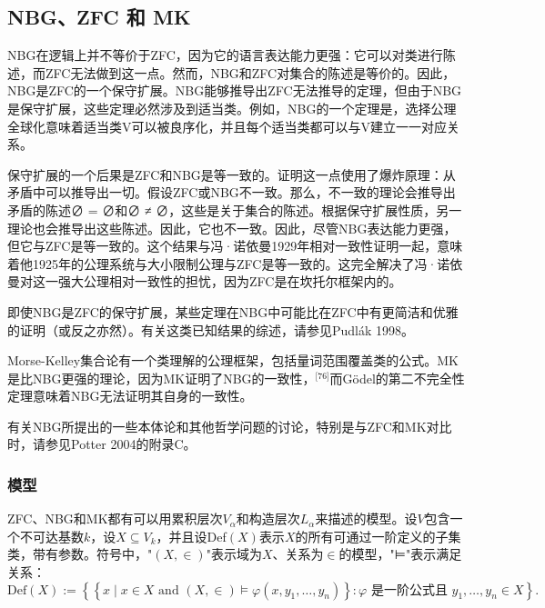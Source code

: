 \subsection{NBG、ZFC 和 MK}  
NBG在逻辑上并不等价于ZFC，因为它的语言表达能力更强：它可以对类进行陈述，而ZFC无法做到这一点。然而，NBG和ZFC对集合的陈述是等价的。因此，NBG是ZFC的一个保守扩展。NBG能够推导出ZFC无法推导的定理，但由于NBG是保守扩展，这些定理必然涉及到适当类。例如，NBG的一个定理是，选择公理全球化意味着适当类V可以被良序化，并且每个适当类都可以与V建立一一对应关系。

保守扩展的一个后果是ZFC和NBG是等一致的。证明这一点使用了爆炸原理：从矛盾中可以推导出一切。假设ZFC或NBG不一致。那么，不一致的理论会推导出矛盾的陈述∅ = ∅和∅ ≠ ∅，这些是关于集合的陈述。根据保守扩展性质，另一理论也会推导出这些陈述。因此，它也不一致。因此，尽管NBG表达能力更强，但它与ZFC是等一致的。这个结果与冯·诺依曼1929年相对一致性证明一起，意味着他1925年的公理系统与大小限制公理与ZFC是等一致的。这完全解决了冯·诺依曼对这一强大公理相对一致性的担忧，因为ZFC是在坎托尔框架内的。

即使NBG是ZFC的保守扩展，某些定理在NBG中可能比在ZFC中有更简洁和优雅的证明（或反之亦然）。有关这类已知结果的综述，请参见Pudlák 1998。

Morse-Kelley集合论有一个类理解的公理框架，包括量词范围覆盖类的公式。MK是比NBG更强的理论，因为MK证明了NBG的一致性，\(^\text{[76]}\)而Gödel的第二不完全性定理意味着NBG无法证明其自身的一致性。

有关NBG所提出的一些本体论和其他哲学问题的讨论，特别是与ZFC和MK对比时，请参见Potter 2004的附录C。
\subsubsection{模型}  
ZFC、NBG和MK都有可以用累积层次\(V_\alpha\)和构造层次\(L_\alpha\)来描述的模型。设\(V\)包含一个不可达基数\(k\)，设\(X \subseteq V_k\)，并且设Def\((X)\)表示\(X\)的所有可通过一阶定义的子集类，带有参数。符号中，"\((X, \in)\)"表示域为\(X\)、关系为\(\in\)的模型，"⊨"表示满足关系：
\[
\text{Def}(X) := \left\{ \left\{ x \mid x \in X \text{ and } (X, \in) \models \varphi(x, y_1, \ldots, y_n) \right\} : \varphi \text{ 是一阶公式且 } y_1, \ldots, y_n \in X \right\}.~
\]

